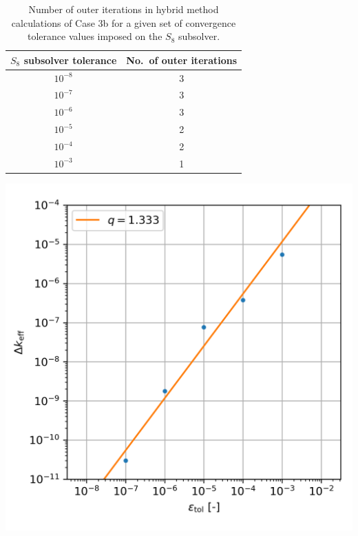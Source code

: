 \documentclass[letterpaper]{mc2025}
\begin{document}
\begin{table}[htb]
  \begin{minipage}{0.45\columnwidth}
    \centering
    \small
    \caption{Number of outer iterations in hybrid method calculations of Case 3b for a given set of
    convergence tolerance values imposed on the $S_8$ subsolver.}
    \begin{tabular}{S S} %
      \toprule
      {$S_8$ subsolver tolerance} & {No.\ of outer iterations} \\
      \midrule
      {$10^{-8}$} & 3 \\
      {$10^{-7}$} & 3 \\
      {$10^{-6}$} & 3 \\
      {$10^{-5}$} & 2 \\
      {$10^{-4}$} & 2 \\
      {$10^{-3}$} & 1 \\
      \bottomrule
    \end{tabular}
    \label{table:sn-tol}
  \end{minipage}
  \begin{minipage}{0.55\columnwidth}
    \centering
    \includegraphics[width=0.75\columnwidth]{sn-tol}
    \label{fig:sn-tol}
  \end{minipage}
\end{table}
\end{document}
